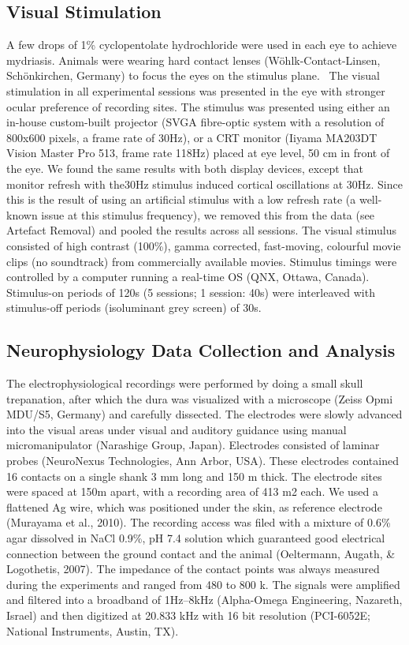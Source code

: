 \subsection{Visual Stimulation}
A few drops of 1\% cyclopentolate hydrochloride were used in each eye to achieve mydriasis. Animals were wearing hard contact lenses (W\"ohlk-Contact-Linsen, Sch\"onkirchen, Germany) to focus the eyes on the stimulus plane. \ The visual stimulation in all experimental sessions was presented in the eye with stronger ocular preference of recording sites. The stimulus was presented using either an in-house custom-built projector (SVGA fibre-optic system with a resolution of 800x600 pixels, a frame rate of 30Hz), or a CRT monitor (Iiyama MA203DT Vision Master Pro 513, frame rate 118Hz) placed at eye level, 50 cm in front of the eye. We found the same results with both display devices, except that monitor refresh with the30Hz stimulus induced cortical oscillations at 30Hz. Since this is the result of using an artificial stimulus with a low refresh rate (a well-known issue at this stimulus frequency), we removed this from the data (see Artefact Removal) and pooled the results across all sessions. The visual stimulus consisted of high contrast (100\%), gamma corrected, fast-moving, colourful movie clips (no soundtrack) from commercially available movies. Stimulus timings were controlled by a computer running a real-time OS (QNX, Ottawa, Canada). Stimulus-on periods of 120s (5 sessions; 1 session: 40s) were interleaved with stimulus-off periods (isoluminant grey screen) of 30s. 

\subsection{Neurophysiology Data Collection and Analysis}
The electrophysiological recordings were performed by doing a small skull trepanation, after which the dura was visualized with a microscope (Zeiss Opmi MDU/S5, Germany) and carefully dissected. The electrodes were slowly advanced into the visual areas under visual and auditory guidance using manual micromanipulator (Narashige Group, Japan). Electrodes consisted of laminar probes (NeuroNexus Technologies, Ann Arbor, USA). These electrodes contained 16 contacts on a single shank 3 mm long and 150 {\textmu}m thick. The electrode sites were spaced at 150{\textmu}m apart, with a recording area of 413 {\textmu}m2 each. We used a flattened Ag wire, which was positioned under the skin, as reference electrode (Murayama et al., 2010). The recording access was filed with a mixture of 0.6\% agar dissolved in NaCl 0.9\%, pH 7.4 solution which guaranteed good electrical connection between the ground contact and the animal (Oeltermann, Augath, \& Logothetis, 2007). The impedance of the contact points was always measured during the experiments and ranged from 480 to 800 k{\textohm}. The signals were amplified and filtered into a broadband of 1Hz--8kHz (Alpha-Omega Engineering, Nazareth, Israel) and then digitized at 20.833 kHz with 16 bit resolution (PCI-6052E; National Instruments, Austin, TX).

